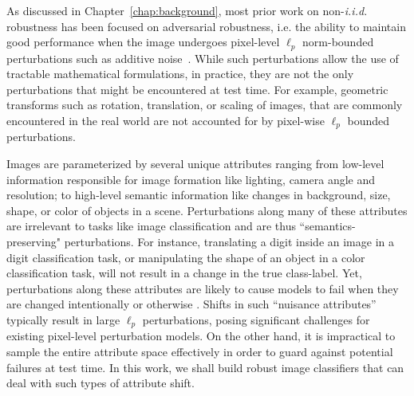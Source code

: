As discussed in Chapter~\ref{chap:background}, most prior work on non-\textit{i.i.d.} robustness has been focused on adversarial robustness, i.e. the ability to maintain good performance when the image undergoes pixel-level $\ell_p$ norm-bounded perturbations such as additive noise~\citep{goodfellow2014explaining,sinha2018certifying,madry2018towards,raghunathan2018certified}.
While such perturbations allow the use of tractable mathematical formulations, in practice, they are not the only perturbations that might be encountered at test time.
For example, geometric transforms such as rotation, translation, or scaling of images, that are commonly encountered in the real world are not accounted for by pixel-wise $\ell_p$ bounded perturbations.

Images are parameterized by several unique attributes ranging from low-level information responsible for image formation like lighting, camera angle and resolution; to high-level semantic information like changes in background, size, shape, or color of objects in a scene.
Perturbations along many of these attributes are irrelevant to tasks like image classification and are thus ``semantics-preserving" perturbations.
For instance, translating a digit inside an image in a digit classification task, or manipulating the shape of an object in a color classification task, will not result in a change in the true class-label.
Yet, perturbations along these attributes are likely to cause models to fail when they are changed intentionally or otherwise \citep{xiao2020noise,joshi2019semantic,liu2018beyond}.
Shifts in such ``nuisance attributes'' typically result in large $\ell_p$ perturbations, posing significant challenges for existing pixel-level perturbation models.
On the other hand, it is impractical to sample the entire attribute space effectively in order to guard against potential failures at test time.
In this work, we shall build robust image classifiers that can deal with such types of attribute shift.

